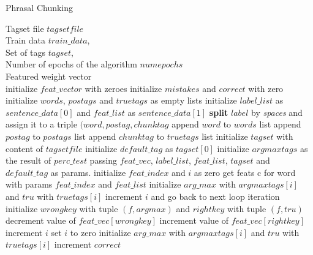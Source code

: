 \documentclass[11pt]{article}
\begin{document}
\begin{algorithm}[htb]
	\renewcommand{\algorithmicrequire}{\textbf{Input:}\hspace{10.7pt}}
	\renewcommand\algorithmicensure {\textbf{Output:} }
	\caption{Phrasal Chunking}
	\label{alg:pbg}
		\begin{algorithmic}[1]
		\vspace{3pt}
		\REQUIRE
		Tagset file $tagsetfile$\\
		Train data $train\_data$,\\
		Set of tags $tagset$,\\
		Number of epochs of the algorithm $numepochs$\\
		\ENSURE Featured weight vector \\
		\STATE initialize $feat\_vector$ with zeroes
		  \STATE initialize $mistakes$ and $correct$ with zero
		    \STATE initialize $words$, $postags$ and $truetags$ as empty lists
		    \STATE initialize $label\_list$ as $sentence\_data[0]$ and $feat\_list$ as $sentence\_data[1]$	    	
		      \STATE \textbf{split} $label$ by \textit{spaces} and assign it to a triple $(word, postag, chunktag$ 
		      \STATE append $word$ to $words$ list
		      \STATE append $postag$ to $postags$ list
		      \STATE append $chunktag$ to $truetags$ list
		    \ENDFOR		    
		    \STATE initialize $tagset$ with content of $tagsetfile$
		    \STATE initialize $default\_tag$ as $tagset[0]$
		    \STATE initialize $argmaxtags$ as the result of $perc\_test$ passing $feat\_vec$, $label\_list$, $feat\_list$, $tagset$ and $default\_tag$ as params.
		    \STATE initialize $feat\_index$ and $i$ as zero
		      \STATE get feats c for word with params $feat\_index$ and $feat\_list$
		      \STATE initialize $arg\_max$ with $argmaxtags[i]$ and $tru$ with $truetags[i]$
		        \STATE increment $i$ and go back to next loop iteration		      
		      \ENDIF
		        \STATE initialize $wrongkey$ with tuple $(f, argmax)$ and $rightkey$ with tuple $(f, tru)$
		        \STATE decrement value of $feat\_vec[wrongkey]$
		        \STATE increment value of $feat\_vec[rightkey]$
		      \ENDFOR
		      \STATE increment $i$
		    \ENDFOR
		    \STATE set $i$ to zero
		      \STATE initialize $arg\_max$ with $argmaxtags[i]$ and $tru$ with $truetags[i]$
		        \STATE increment $correct$

\end{algorithmic}
\end{algorithm}
\end{document}
